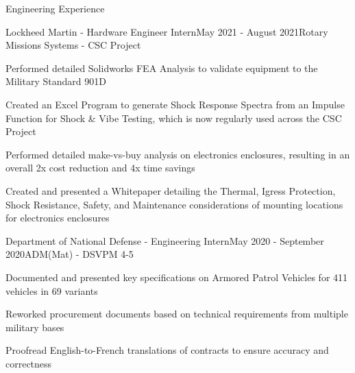 \documentclass{resume} %
\begin{document}
\begin{rSection}{Engineering Experience}

\begin{rSubsection}{Lockheed Martin - Hardware Engineer Intern}{May 2021 - August 2021}{Rotary Missions Systems - CSC Project}{}

\item Performed detailed Solidworks FEA Analysis to validate equipment to the Military Standard 901D
\item Created an Excel Program to generate Shock Response Spectra from an Impulse Function for Shock \& Vibe Testing, which is now regularly used across the CSC Project
\item Performed detailed make-vs-buy analysis on electronics enclosures, resulting in an overall 2x cost reduction and 4x time savings
\item Created and presented a Whitepaper detailing the Thermal, Igress Protection, Shock Resistance, Safety, and Maintenance considerations of mounting locations for electronics enclosures

\end{rSubsection}

\begin{rSubsection}{Department of National Defense - Engineering Intern}{May 2020 - September 2020}{ADM(Mat) - DSVPM 4-5}{}

\item Documented and presented key specifications on Armored Patrol Vehicles for 411 vehicles in 69 variants
\item Reworked procurement documents based on technical requirements from multiple military bases
\item Proofread English-to-French translations of contracts to ensure accuracy and correctness

\end{rSubsection}
\end{rSection}

\end{document}
